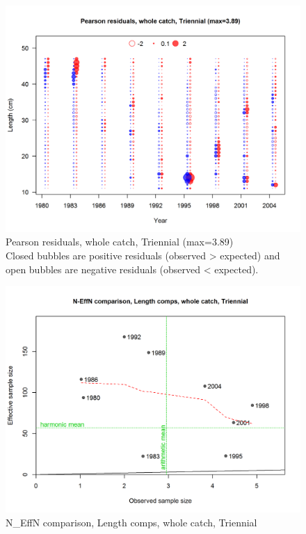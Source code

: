 \documentclass[12pt,]{article}
\begin{document}
\begin{figure}
\centering
\includegraphics{./r4ss/plots_mod1/comp_lenfit_residsflt5mkt0.png}
\caption{Pearson residuals, whole catch, Triennial (max=3.89)\\
Closed bubbles are positive residuals (observed \textgreater{} expected)
and open bubbles are negative residuals (observed \textless{} expected).
\label{fig:mod1_19_comp_lenfit_residsflt5mkt0}}
\end{figure}

\begin{figure}
\centering
\includegraphics{./r4ss/plots_mod1/comp_lenfit_sampsize_flt5mkt0.png}
\caption{N\_EffN comparison, Length comps, whole catch, Triennial
\label{fig:mod1_20_comp_lenfit_sampsize_flt5mkt0}}
\end{figure}
\end{document}
